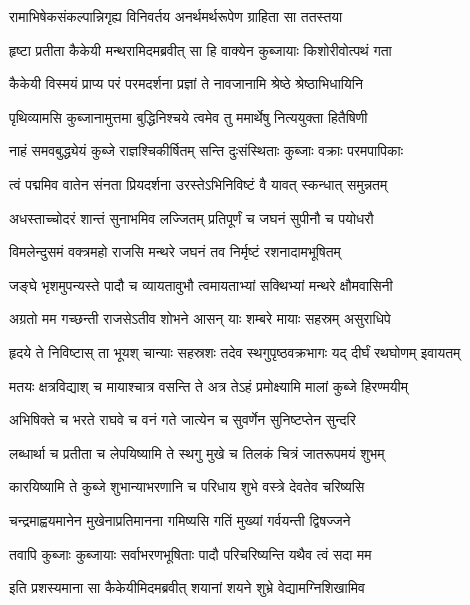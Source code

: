 \twolineshloka
{रामाभिषेकसंकल्पान्निगृह्य विनिवर्तय}
{अनर्थमर्थरूपेण ग्राहिता सा ततस्तया} %

\twolineshloka
{हृष्टा प्रतीता कैकेयी मन्थरामिदमब्रवीत्}
{सा हि वाक्येन कुब्जायाः किशोरीवोत्पथं गता} %

\twolineshloka
{कैकेयी विस्मयं प्राप्य परं परमदर्शना}
{प्रज्ञां ते नावजानामि श्रेष्ठे श्रेष्ठाभिधायिनि} %

\twolineshloka
{पृथिव्यामसि कुब्जानामुत्तमा बुद्धिनिश्चये}
{त्वमेव तु ममार्थेषु नित्ययुक्ता हितैषिणी} %

\twolineshloka
{नाहं समवबुद्ध्येयं कुब्जे राज्ञश्चिकीर्षितम्}
{सन्ति दुःसंस्थिताः कुब्जाः वक्राः परमपापिकाः} %

\twolineshloka
{त्वं पद्ममिव वातेन संनता प्रियदर्शना}
{उरस्तेऽभिनिविष्टं वै यावत् स्कन्धात् समुन्नतम्} %

\twolineshloka
{अधस्ताच्चोदरं शान्तं सुनाभमिव लज्जितम्}
{प्रतिपूर्णं च जघनं सुपीनौ च पयोधरौ} %

\twolineshloka
{विमलेन्दुसमं वक्त्रमहो राजसि मन्थरे}
{जघनं तव निर्मृष्टं रशनादामभूषितम्} %

\twolineshloka
{जङ्घे भृशमुपन्यस्ते पादौ च व्यायतावुभौ}
{त्वमायताभ्यां सक्थिभ्यां मन्थरे क्षौमवासिनी} %

\twolineshloka
{अग्रतो मम गच्छन्ती राजसेऽतीव शोभने}
{आसन् याः शम्बरे मायाः सहस्रम् असुराधिपे} %

\twolineshloka
{हृदये ते निविष्टास् ता भूयश् चान्याः सहस्रशः}
{तदेव स्थगुपृष्ठवक्रभागः यद् दीर्घं रथघोणम् इवायतम्} %

\twolineshloka
{मतयः क्षत्रविद्याश् च मायाश्चात्र वसन्ति ते}
{अत्र तेऽहं प्रमोक्ष्यामि मालां कुब्जे हिरण्मयीम्} %

\twolineshloka
{अभिषिक्ते च भरते राघवे च वनं गते}
{जात्येन च सुवर्णेन सुनिष्टप्तेन सुन्दरि} %

\twolineshloka
{लब्धार्था च प्रतीता च लेपयिष्यामि ते स्थगु}
{मुखे च तिलकं चित्रं जातरूपमयं शुभम्} %

\twolineshloka
{कारयिष्यामि ते कुब्जे शुभान्याभरणानि च}
{परिधाय शुभे वस्त्रे देवतेव चरिष्यसि} %

\twolineshloka
{चन्द्रमाह्वयमानेन मुखेनाप्रतिमानना}
{गमिष्यसि गतिं मुख्यां गर्वयन्ती द्विषज्जने} %

\twolineshloka
{तवापि कुब्जाः कुब्जायाः सर्वाभरणभूषिताः}
{पादौ परिचरिष्यन्ति यथैव त्वं सदा मम} %

\twolineshloka
{इति प्रशस्यमाना सा कैकेयीमिदमब्रवीत्}
{शयानां शयने शुभ्रे वेद्यामग्निशिखामिव} %

